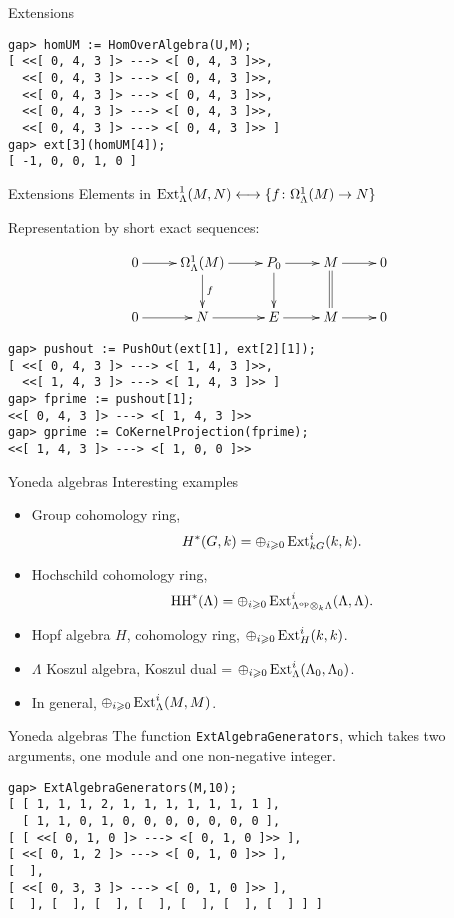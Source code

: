 \begin{frame}[fragile]{Extensions}
\begin{verbatim}
gap> homUM := HomOverAlgebra(U,M);
[ <<[ 0, 4, 3 ]> ---> <[ 0, 4, 3 ]>>,
  <<[ 0, 4, 3 ]> ---> <[ 0, 4, 3 ]>>, 
  <<[ 0, 4, 3 ]> ---> <[ 0, 4, 3 ]>>,
  <<[ 0, 4, 3 ]> ---> <[ 0, 4, 3 ]>>, 
  <<[ 0, 4, 3 ]> ---> <[ 0, 4, 3 ]>> ]
gap> ext[3](homUM[4]);
[ -1, 0, 0, 1, 0 ]
\end{verbatim}
\end{frame}

\begin{frame}[fragile]{Extensions}
Elements in $\operatorname{Ext}\nolimits^1_\Lambda(M,N) \longleftrightarrow \{f\colon
\Omega^1_\Lambda(M)\to N\}$

Representation by short exact sequences:

\[\xymatrix{
0\ar[r] & \Omega^1_\Lambda(M)\ar[r]\ar[d]^f & P_0\ar[r]\ar[d] &
M\ar[r]\ar@{=}[d] & 0\\
0\ar[r] & N \ar[r] & E\ar[r] & M\ar[r] & 0
}\]

\begin{verbatim}
gap> pushout := PushOut(ext[1], ext[2][1]);
[ <<[ 0, 4, 3 ]> ---> <[ 1, 4, 3 ]>>,
  <<[ 1, 4, 3 ]> ---> <[ 1, 4, 3 ]>> ]
gap> fprime := pushout[1];     
<<[ 0, 4, 3 ]> ---> <[ 1, 4, 3 ]>>
gap> gprime := CoKernelProjection(fprime); 
<<[ 1, 4, 3 ]> ---> <[ 1, 0, 0 ]>>
\end{verbatim}
\end{frame}

\begin{frame}[fragile]{Yoneda algebras}
Interesting examples
\begin{itemize}
\item Group cohomology ring, 
\[H^*(G,k) = \oplus_{i\geqslant 0} \operatorname{Ext}\nolimits^i_{kG}(k,k).\]
\item Hochschild cohomology ring, 
\[\operatorname{HH}\nolimits^*(\Lambda) = \oplus_{i\geqslant 0} \operatorname{Ext}\nolimits^i_{\Lambda^{\operatorname{op}\nolimits}\otimes_k\Lambda}(\Lambda,\Lambda).\] 
\item Hopf algebra $H$, cohomology ring, $\oplus_{i\geqslant 0}
  \operatorname{Ext}\nolimits^i_H(k,k)$. 
\item $\Lambda$ Koszul algebra, Koszul dual = $\oplus_{i\geqslant 0}
  \operatorname{Ext}\nolimits^i_\Lambda(\Lambda_0,\Lambda_0)$. 
\item In general, $\oplus_{i\geqslant 0} \operatorname{Ext}\nolimits^i_\Lambda(M,M)$. 
\end{itemize}
\end{frame}

\begin{frame}[fragile]{Yoneda algebras}
  The function \texttt{ExtAlgebraGenerators}, which takes two
  arguments, one module and one non-negative integer.
\begin{verbatim}
gap> ExtAlgebraGenerators(M,10);
[ [ 1, 1, 1, 2, 1, 1, 1, 1, 1, 1, 1 ], 
  [ 1, 1, 0, 1, 0, 0, 0, 0, 0, 0, 0 ], 
[ [ <<[ 0, 1, 0 ]> ---> <[ 0, 1, 0 ]>> ], 
[ <<[ 0, 1, 2 ]> ---> <[ 0, 1, 0 ]>> ], 
[  ], 
[ <<[ 0, 3, 3 ]> ---> <[ 0, 1, 0 ]>> ], 
[  ], [  ], [  ], [  ], [  ], [  ], [  ] ] ]
\end{verbatim}
\end{frame}

